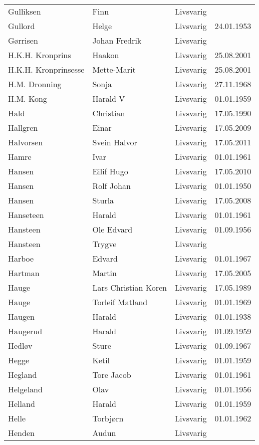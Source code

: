\documentclass[fsbok.tex]{subfiles}
\begin{document}
\begin{longtable}{llll}
Gulliksen	&	Finn	&	Livsvarig 	&		\\
Gullord	&	Helge	&	Livsvarig 	&	24.01.1953	\\
Gørrisen	&	Johan Fredrik	&	Livsvarig 	&		\\
H.K.H. Kronprins	&	Haakon 	&	Livsvarig	&	25.08.2001	\\
H.K.H. Kronprinsesse	&	Mette-Marit 	&	Livsvarig	&	25.08.2001	\\
H.M. Dronning	&	Sonja	&	Livsvarig 	&	27.11.1968	\\
H.M. Kong	&	Harald V	&	Livsvarig 	&	01.01.1959	\\
Hald	&	Christian	&	Livsvarig 	&	17.05.1990	\\
Hallgren	&	Einar	&	Livsvarig	&	17.05.2009	\\
Halvorsen	&	Svein Halvor	&	Livsvarig	&	17.05.2011	\\
Hamre	&	Ivar	&	Livsvarig 	&	01.01.1961	\\
Hansen	&	Eilif Hugo	&	Livsvarig	&	17.05.2010	\\
Hansen	&	Rolf Johan	&	Livsvarig 	&	01.01.1950	\\
Hansen	&	Sturla	&	Livsvarig	&	17.05.2008	\\
Hanseteen	&	Harald	&	Livsvarig 	&	01.01.1961	\\
Hansteen	&	Ole Edvard	&	Livsvarig 	&	01.09.1956	\\
Hansteen	&	Trygve	&	Livsvarig 	&		\\
Harboe	&	Edvard	&	Livsvarig 	&	01.01.1967	\\
Hartman 	&	Martin	&	Livsvarig	&	17.05.2005	\\
Hauge	&	Lars Christian Koren	&	Livsvarig 	&	17.05.1989	\\
Hauge	&	Torleif Matland	&	Livsvarig 	&	01.01.1969	\\
Haugen	&	Harald	&	Livsvarig 	&	01.01.1938	\\
Haugerud	&	Harald	&	Livsvarig 	&	01.09.1959	\\
Hedløv	&	Sture	&	Livsvarig 	&	01.09.1967	\\
Hegge	&	Ketil	&	Livsvarig 	&	01.01.1959	\\
Hegland	&	Tore Jacob	&	Livsvarig 	&	01.01.1961	\\
Helgeland	&	Olav	&	Livsvarig 	&	01.01.1956	\\
Helland	&	Harald	&	Livsvarig 	&	01.01.1959	\\
Helle	&	Torbjørn	&	Livsvarig 	&	01.01.1962	\\
Henden	&	Audun	&	Livsvarig 	&		\\

\end{longtable}
\end{document}
